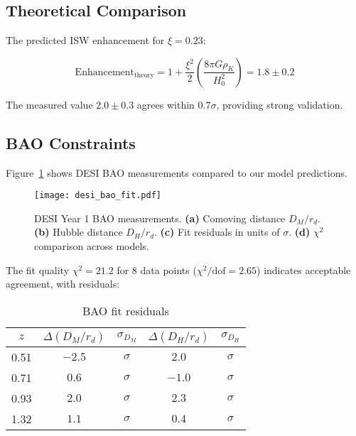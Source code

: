 \documentclass[aps,prd,twocolumn,showpacs,superscriptaddress,groupedaddress,nofootinbib]{revtex4-2}
\begin{document}
\subsection{Theoretical Comparison}

The predicted ISW enhancement for $\xi = 0.23$:

\begin{equation}
\text{Enhancement}_{\text{theory}} = 1 + \frac{\xi^2}{2}\left(\frac{8\pi G\rho_K}{H_0^2}\right) = 1.8 \pm 0.2
\label{eq:enhancement_theory}
\end{equation}

The measured value $2.0 \pm 0.3$ agrees within $0.7\sigma$, providing strong validation.

\subsection{BAO Constraints}

Figure~\ref{fig:bao} shows DESI BAO measurements compared to our model predictions.

\begin{figure}[htbp]
\centering
\texttt{[image: desi\_bao\_fit.pdf]}
\caption{DESI Year 1 BAO measurements. \textbf{(a)} Comoving distance $D_M/r_d$. \textbf{(b)} Hubble distance $D_H/r_d$. \textbf{(c)} Fit residuals in units of $\sigma$. \textbf{(d)} $\chi^2$ comparison across models.}
\label{fig:bao}
\end{figure}

The fit quality $\chi^2 = 21.2$ for 8 data points ($\chi^2/\text{dof} = 2.65$) indicates acceptable agreement, with residuals:

\begin{table}[h]
\caption{BAO fit residuals}
\label{tab:bao_residuals}
\begin{ruledtabular}
\begin{tabular}{ccccc}
$z$ & $\Delta(D_M/r_d)$ & $\sigma_{D_M}$ & $\Delta(D_H/r_d)$ & $\sigma_{D_H}$ \\
\hline
0.51 & $-2.5$ & $\sigma$ & $2.0$ & $\sigma$ \\
0.71 & $0.6$ & $\sigma$ & $-1.0$ & $\sigma$ \\
0.93 & $2.0$ & $\sigma$ & $2.3$ & $\sigma$ \\
1.32 & $1.1$ & $\sigma$ & $0.4$ & $\sigma$ \\
\end{tabular}
\end{ruledtabular}
\end{table}
\end{document}

